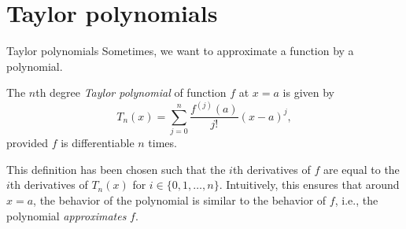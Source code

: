 \iffalse

MIT License

Copyright (c) 2023 Aron Hardeman

Permission is hereby granted, free of charge, to any person obtaining a copy
of this software and associated documentation files (the "Software"), to deal
in the Software without restriction, including without limitation the rights
to use, copy, modify, merge, publish, distribute, sublicense, and/or sell
copies of the Software, and to permit persons to whom the Software is
furnished to do so, subject to the following conditions:

The above copyright notice and this permission notice shall be included in all
copies or substantial portions of the Software.

THE SOFTWARE IS PROVIDED "AS IS", WITHOUT WARRANTY OF ANY KIND, EXPRESS OR
IMPLIED, INCLUDING BUT NOT LIMITED TO THE WARRANTIES OF MERCHANTABILITY,
FITNESS FOR A PARTICULAR PURPOSE AND NONINFRINGEMENT. IN NO EVENT SHALL THE
AUTHORS OR COPYRIGHT HOLDERS BE LIABLE FOR ANY CLAIM, DAMAGES OR OTHER
LIABILITY, WHETHER IN AN ACTION OF CONTRACT, TORT OR OTHERWISE, ARISING FROM,
OUT OF OR IN CONNECTION WITH THE SOFTWARE OR THE USE OR OTHER DEALINGS IN THE
SOFTWARE.

\fi
\section{Taylor polynomials}
\begin{frame}{Taylor polynomials}
    Sometimes, we want to approximate a function by a polynomial.

    The $n$th degree \emph{Taylor polynomial} of function $f$ at $x=a$ is given by
    \[T_n(x)=\sum_{j=0}^n\frac{f^{(j)}(a)}{j!}(x-a)^j,\]
    provided $f$ is differentiable $n$ times.

    \color{gray}This definition has been chosen such that the $i$th derivatives of $f$ are equal to the $i$th derivatives of $T_n(x)$ for $i\in\{0,1,\dots,n\}$. Intuitively, this ensures that around $x=a$, the behavior of the polynomial is similar to the behavior of $f$, i.e., the polynomial \emph{approximates} $f$.
\end{frame}


